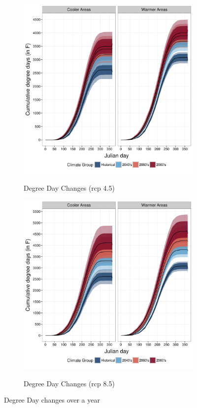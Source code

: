 \documentclass[12pt]{article}
\theoremstyle{plain}
\theoremstyle{definition}
\theoremstyle{definition}
\begin{document}
\begin{figure}[h!]
\begin{subfigure}{.46\textwidth}
  \centering
  \includegraphics[width=1\linewidth]{figures/plot_cumdd_rcp45}
  \label{fig:DDC45}
\caption{Degree Day Changes (rcp 4.5)}
\end{subfigure}\hfill
\begin{subfigure}{.46\textwidth}
  \centering
  \includegraphics[width=1\linewidth]{figures/plot_cumdd_rcp85}
  \label{fig:DDC85}
\caption{Degree Day Changes (rcp 8.5)}
\end{subfigure}
\caption{Degree Day changes over a year}
\label{fig:DDC}
\end{figure}
\pagebreak
\end{document}
